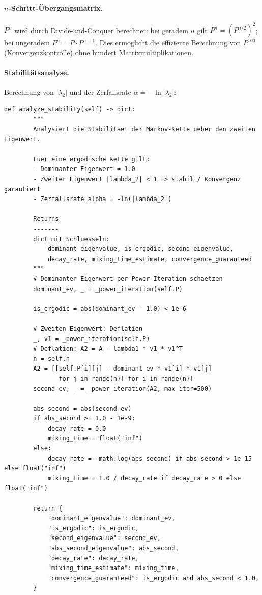 ﻿\documentclass[a4paper,12pt]{scrreprt}
\theoremstyle{definition}
\begin{document}
\paragraph{$n$-Schritt-Übergangsmatrix.}
$P^n$ wird durch Divide-and-Conquer berechnet: bei geradem $n$ gilt
$P^n = (P^{n/2})^2$; bei ungeradem $P^n = P \cdot P^{n-1}$. Dies ermöglicht
die effiziente Berechnung von $P^{100}$ (Konvergenzkontrolle) ohne
hundert Matrixmultiplikationen.

\paragraph{Stabilitätsanalyse.}
Berechnung von $|\lambda_2|$ und der Zerfallsrate $\alpha = -\ln|\lambda_2|$:

\begin{lstlisting}[style=python, caption={Stabilitätsanalyse: Zerfallsrate und Mixing-Zeit}, label=lst:stability-impl]
def analyze_stability(self) -> dict:
        """
        Analysiert die Stabilitaet der Markov-Kette ueber den zweiten Eigenwert.

        Fuer eine ergodische Kette gilt:
        - Dominanter Eigenwert = 1.0
        - Zweiter Eigenwert |lambda_2| < 1 => stabil / Konvergenz garantiert
        - Zerfallsrate alpha = -ln(|lambda_2|)

        Returns
        -------
        dict mit Schluesseln:
            dominant_eigenvalue, is_ergodic, second_eigenvalue,
            decay_rate, mixing_time_estimate, convergence_guaranteed
        """
        # Dominanten Eigenwert per Power-Iteration schaetzen
        dominant_ev, _ = _power_iteration(self.P)

        is_ergodic = abs(dominant_ev - 1.0) < 1e-6

        # Zweiten Eigenwert: Deflation
        _, v1 = _power_iteration(self.P)
        # Deflation: A2 = A - lambda1 * v1 * v1^T
        n = self.n
        A2 = [[self.P[i][j] - dominant_ev * v1[i] * v1[j]
               for j in range(n)] for i in range(n)]
        second_ev, _ = _power_iteration(A2, max_iter=500)

        abs_second = abs(second_ev)
        if abs_second >= 1.0 - 1e-9:
            decay_rate = 0.0
            mixing_time = float("inf")
        else:
            decay_rate = -math.log(abs_second) if abs_second > 1e-15 else float("inf")
            mixing_time = 1.0 / decay_rate if decay_rate > 0 else float("inf")

        return {
            "dominant_eigenvalue": dominant_ev,
            "is_ergodic": is_ergodic,
            "second_eigenvalue": second_ev,
            "abs_second_eigenvalue": abs_second,
            "decay_rate": decay_rate,
            "mixing_time_estimate": mixing_time,
            "convergence_guaranteed": is_ergodic and abs_second < 1.0,
        }
\end{lstlisting}
\end{document}
